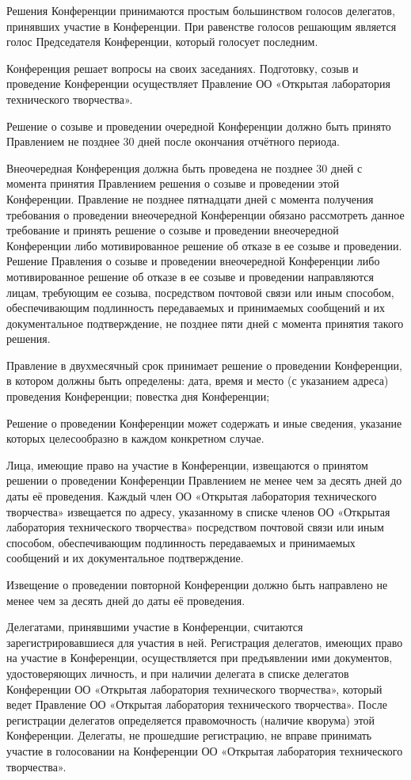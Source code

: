 \documentclass[a4paper,14pt,titlepage]{extarticle}
\begin{document}
Решения Конференции принимаются простым большинством голосов делегатов, принявших участие в Конференции. При равенстве
голосов решающим является голос Председателя Конференции, который голосует последним.

Конференция решает вопросы на своих заседаниях. Подготовку, созыв и проведение Конференции осуществляет Правление ОО
«Открытая лаборатория технического творчества».

Решение о созыве и проведении очередной Конференции должно быть принято Правлением не позднее 30 дней после окончания
отчётного периода.

Внеочередная Конференция должна быть проведена не позднее 30 дней с момента принятия Правлением решения о созыве и
проведении этой Конференции. Правление не позднее пятнадцати дней с момента получения требования о проведении
внеочередной Конференции обязано рассмотреть данное требование и принять решение о созыве и проведении внеочередной
Конференции либо мотивированное решение об отказе в ее созыве и проведении. Решение Правления о созыве и проведении
внеочередной Конференции либо мотивированное решение об отказе в ее созыве и проведении направляются лицам, требующим ее
созыва, посредством почтовой связи или иным способом, обеспечивающим подлинность передаваемых и принимаемых сообщений и
их документальное подтверждение, не позднее пяти дней с момента принятия такого решения.

Правление в двухмесячный срок принимает решение о проведении Конференции, в котором должны быть определены:
дата, время и место (с указанием адреса) проведения Конференции;
повестка дня Конференции;

Решение о проведении Конференции может содержать и иные сведения, указание которых целесообразно в каждом конкретном
случае.

Лица, имеющие право на участие в Конференции, извещаются о принятом решении о проведении Конференции Правлением не менее
чем за десять дней до даты её проведения. Каждый член ОО «Открытая лаборатория технического творчества» извещается по
адресу, указанному в списке членов ОО «Открытая лаборатория технического творчества» посредством почтовой связи или иным
способом, обеспечивающим подлинность передаваемых и принимаемых сообщений и их документальное подтверждение.

Извещение о проведении повторной Конференции должно быть направлено не менее чем за десять дней до даты её проведения.

Делегатами, принявшими участие в Конференции, считаются зарегистрировавшиеся для участия в ней. Регистрация делегатов,
имеющих право на участие в Конференции, осуществляется при предъявлении ими документов, удостоверяющих личность, и при
наличии делегата в списке делегатов Конференции ОО «Открытая лаборатория технического творчества», который ведет
Правление ОО «Открытая лаборатория технического творчества». После регистрации делегатов определяется правомочность
(наличие кворума) этой Конференции. Делегаты, не прошедшие регистрацию, не вправе принимать участие в голосовании на
Конференции ОО «Открытая лаборатория технического творчества».
\end{document}
